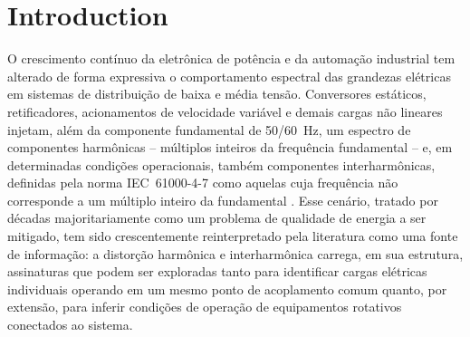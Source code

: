 \documentclass[times,final]{elsarticle}
\begin{document}
\section{Introduction}
\label{cap:introducao}
O crescimento contínuo da eletrônica de potência e da automação industrial tem alterado de forma expressiva o comportamento espectral das grandezas elétricas em sistemas de distribuição de baixa e média tensão. Conversores estáticos, retificadores, acionamentos de velocidade variável e demais cargas não lineares injetam, além da componente fundamental de 50/60~Hz, um espectro de componentes harmônicas -- múltiplos inteiros da frequência fundamental -- e, em determinadas condições operacionais, também componentes interharmônicas, definidas pela norma IEC~61000-4-7 como aquelas cuja frequência não corresponde a um múltiplo inteiro da fundamental \citep{efe2016}. Esse cenário, tratado por décadas majoritariamente como um problema de qualidade de energia a ser mitigado, tem sido crescentemente reinterpretado pela literatura como uma fonte de informação: a distorção harmônica e interharmônica carrega, em sua estrutura, assinaturas que podem ser exploradas tanto para identificar cargas elétricas individuais operando em um mesmo ponto de acoplamento comum quanto, por extensão, para inferir condições de operação de equipamentos rotativos conectados ao sistema.
\end{document}
